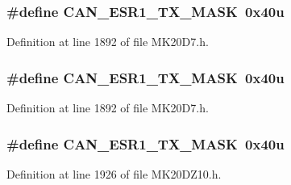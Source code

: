 \subsubsection[{\texorpdfstring{C\+A\+N\+\_\+\+E\+S\+R1\+\_\+\+T\+X\+\_\+\+M\+A\+SK}{CAN_ESR1_TX_MASK}}]{\setlength{\rightskip}{0pt plus 5cm}\#define C\+A\+N\+\_\+\+E\+S\+R1\+\_\+\+T\+X\+\_\+\+M\+A\+SK~0x40u}\hypertarget{group___c_a_n___register___masks_ga29052f7ad6fc3da4cbcd9dce8ffa59f5}{}\label{group___c_a_n___register___masks_ga29052f7ad6fc3da4cbcd9dce8ffa59f5}


Definition at line 1892 of file M\+K20\+D7.\+h.

\subsubsection[{\texorpdfstring{C\+A\+N\+\_\+\+E\+S\+R1\+\_\+\+T\+X\+\_\+\+M\+A\+SK}{CAN_ESR1_TX_MASK}}]{\setlength{\rightskip}{0pt plus 5cm}\#define C\+A\+N\+\_\+\+E\+S\+R1\+\_\+\+T\+X\+\_\+\+M\+A\+SK~0x40u}\hypertarget{group___c_a_n___register___masks_ga29052f7ad6fc3da4cbcd9dce8ffa59f5}{}\label{group___c_a_n___register___masks_ga29052f7ad6fc3da4cbcd9dce8ffa59f5}


Definition at line 1892 of file M\+K20\+D7.\+h.

\subsubsection[{\texorpdfstring{C\+A\+N\+\_\+\+E\+S\+R1\+\_\+\+T\+X\+\_\+\+M\+A\+SK}{CAN_ESR1_TX_MASK}}]{\setlength{\rightskip}{0pt plus 5cm}\#define C\+A\+N\+\_\+\+E\+S\+R1\+\_\+\+T\+X\+\_\+\+M\+A\+SK~0x40u}\hypertarget{group___c_a_n___register___masks_ga29052f7ad6fc3da4cbcd9dce8ffa59f5}{}\label{group___c_a_n___register___masks_ga29052f7ad6fc3da4cbcd9dce8ffa59f5}


Definition at line 1926 of file M\+K20\+D\+Z10.\+h.

